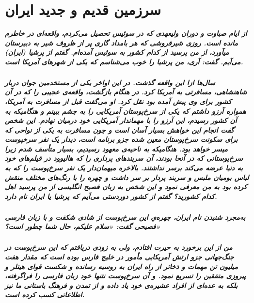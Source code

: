 \chapter{سرزمین قدیم و جدید ایران}
\paragraph{
از ایام صباوت و دوران ولیعهدی که در سوئیس تحصیل می‌کردم، واقعه‌ای در خاطرم مانده است. روزی شیرفروشی که هر بامداد گاری پر از ظروف شیر به دبیرستان میآورد، از من پرسید از کدام کشور به سوئیس آمده‌ام. گفتم از پرشیا (ایران) می‌آیم. گفت: آری، من پرشیا را خوب می‌شناسم که یکی از شهرهای آمریکا است. 
}
\paragraph{
سال‌ها ازا این واقعه گذشت. در این اواخر یکی از مستخدمین جوان دربار شاهنشاهی، مسافرتی به آمریکا کرد. در هنگام بازگشت، واقعه‌ی عجیبی را که در آن کشور برای وی پیش آمده بود نقل کرد. او می‌گفت قبل از مسافرت به آمریکا، همواره آرزو  داشتم که یکی از سرخ‌پوستان آمریکایی را به چشم ببینم و هنگامیکه به آن کشور رسیدم، این آرزو را با مهماندار آمریکایی خود درمیان نهادم. این شخص گفت انجام این خواهش بسیار آسان است و چون مسافرت به یکی از نواحی که برای سکونت سرخ‌پوستان معین شده جزو برنامه است، دیدار یک‌ نفر سرخپوست میسر خواهد بود. 
هنگامیکه به ناحیه‌ی معهود رسیدیم، بسیار متأسف شدم زیرا سرخ‌پوستانی  که در آنحا بودند، آن سربندهای پرداری را که هالیوود در فیلم‌های خود به دنیا عرضه می‌کند برسر نداشتند. بالاخره میهمان‌دار یک نفر سرخ‌پوست را که به لباس بومیان ملبس و سربند پردار بر سر داشت و چهره را با رنگ‌های مختلف منقش کرده بود به من معرفی نمود و این شخص به زبان فصیح انگلیسی از من پرسید اهل کدام کشورید؟ گفتم از کشور دوردستی می‌آیم که پرشیا یا ایران نام دارد.  
}
\paragraph{
به‌مجرد شنیدن نام ایران، چهره‌ي این سرخ‌پوست از شادی شکفت و با زبان فارسی فصیحی گفت: «سلام علیکم، حال شما چطور است؟»
}
\paragraph{
من از این برخورد به حیرت افتادم، ولی به زودی دریافتم که این سرخ‌پوست در جنگ‌‌جهانی جزو ارتش آمریکایی مأمور در خلیج فارس بوده است که مقدار هفت میلیون تن مهمات و ذخائر از راه ایران به روسیه رسانده و شکست قوای هیتلر و پیروزی متفقین را تسریع نمود. و آن سرخ‌پوست نتنها خود زبان فارسی را فراگرفته، بلکه به عده‌ای از افراد عشیره‌ی خود یاد داده و از تمدن و فرهنگ باستانی ما نیز اطلاعاتی کسب کرده است.
}